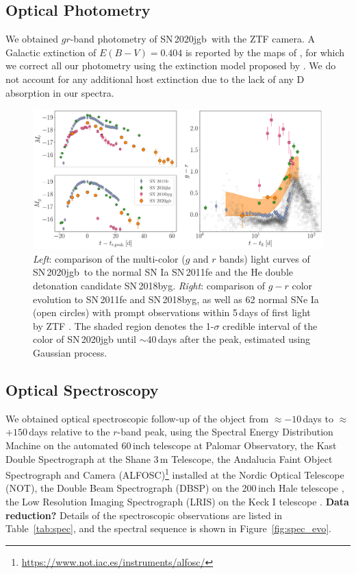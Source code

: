 \documentclass[twocolumn]{aastex631}
\newcommand{\sn}{SN\,2020jgb}
\begin{document}
\subsection{Optical Photometry}
We obtained $gr$-band photometry of \sn\ with the ZTF camera. A Galactic extinction of $E(B-V)=0.404$ is reported by the maps of \citet{Schlafly2011}, for which we correct all our photometry using the extinction model proposed by \citet{Fitzpatrick1999}. We do not account for any additional host extinction due to the lack of any  D absorption in our spectra.

\begin{figure}
    \centering
    \includegraphics[width=\textwidth]{photometry.pdf}
    \caption{\textit{Left}: comparison of the multi-color ($g$ and $r$ bands) light curves of \sn\ to the normal SN Ia SN\,2011fe and the He double detonation candidate SN\,2018byg. \textit{Right}: comparison of $g-r$ color evolution to SN\,2011fe and SN\,2018byg, as well as 62 normal SNe Ia (open circles) with prompt observations within 5\,days of first light by ZTF \citep{Bulla2020}. The shaded region denotes the 1-$\sigma$ credible interval of the color of SN\,2020jgb until $\sim$40\,days after the peak, estimated using Gaussian process.}
    \label{fig:photometry}
\end{figure}

\subsection{Optical Spectroscopy}
We obtained optical spectroscopic follow-up of the object from $\approx$$-10$\,days to $\approx$$+150$\,days relative to the $r$-band peak, using the Spectral Energy Distribution Machine \citep[SEDM;][]{SEDM_2018} on the automated 60\,inch telescope \citep[P60;][]{P60_2006} at Palomar Observatory, the Kast Double Spectrograph \citep{miller1994kast} at the Shane 3\,m Telescope, the Andalucia Faint Object Spectrograph and Camera (ALFOSC)\footnote{\url{https://www.not.iac.es/instruments/alfosc/}} installed at the Nordic Optical Telescope (NOT), the Double Beam Spectrograph (DBSP) on the 200\,inch Hale telescope \citep[P200;][]{P200_1982}, the Low Resolution Imaging Spectrograph (LRIS) on the Keck I telescope \citep{Keck_1995}. \textbf{Data reduction?} Details of the spectroscopic observations are listed in Table~\ref{tab:spec}, and the spectral sequence is shown in Figure~\ref{fig:spec_evo}.
\end{document}
